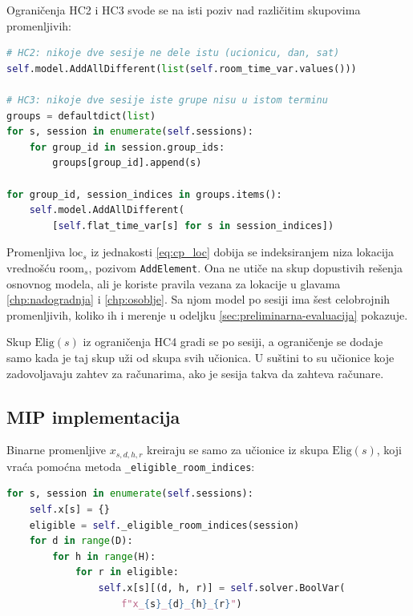 \documentclass[12pt,oneside]{memoir}
\begin{document}
Ograničenja HC2 i HC3 svode se na isti poziv nad različitim skupovima
promenljivih:

\begin{english}
\begin{lstlisting}[language=Python, caption={Ograničenja HC2 i HC3 u CP-SAT modelu}, label={lst:cp_alldiff}]
# HC2: nikoje dve sesije ne dele istu (ucionicu, dan, sat)
self.model.AddAllDifferent(list(self.room_time_var.values()))

# HC3: nikoje dve sesije iste grupe nisu u istom terminu
groups = defaultdict(list)
for s, session in enumerate(self.sessions):
    for group_id in session.group_ids:
        groups[group_id].append(s)

for group_id, session_indices in groups.items():
    self.model.AddAllDifferent(
        [self.flat_time_var[s] for s in session_indices])
\end{lstlisting}
\end{english}

Promenljiva $\text{loc}_s$ iz jednakosti \eqref{eq:cp_loc} dobija se
indeksiranjem niza lokacija vrednošću $\text{room}_s$, pozivom
\texttt{AddElement}. Ona ne utiče na skup dopustivih rešenja osnovnog
modela, ali je koriste pravila vezana za lokacije u glavama
\ref{chp:nadogradnja} i \ref{chp:osoblje}. Sa njom model po sesiji ima
šest celobrojnih promenljivih, koliko ih i merenje u odeljku
\ref{sec:preliminarna-evaluacija} pokazuje.

Skup $\text{Elig}(s)$ iz ograničenja HC4 gradi se po sesiji, a
ograničenje se dodaje samo kada je taj skup uži od skupa svih
učionica. U suštini to su učionice koje zadovoljavaju zahtev za računarima,
ako je sesija takva da zahteva računare.

\subsection{MIP implementacija}

Binarne promenljive $x_{s,d,h,r}$ kreiraju se samo za učionice iz
skupa $\text{Elig}(s)$, koji vraća pomoćna metoda
\texttt{\_eligible\_room\_indices}:

\begin{english}
\begin{lstlisting}[language=Python, caption={Kreiranje binarnih promenljivih}]
for s, session in enumerate(self.sessions):
    self.x[s] = {}
    eligible = self._eligible_room_indices(session)
    for d in range(D):
        for h in range(H):
            for r in eligible:
                self.x[s][(d, h, r)] = self.solver.BoolVar(
                    f"x_{s}_{d}_{h}_{r}")
\end{lstlisting}
\end{english}
\end{document}
